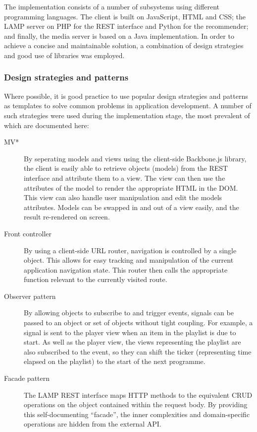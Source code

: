 The implementation consists of a number of subsystems using different programming languages. The client is built on JavaScript, HTML and CSS; the LAMP server on PHP for the REST interface and Python for the recommender; and finally, the media server is based on a Java implementation. In order to achieve a concise and maintainable solution, a combination of design strategies and good use of libraries was employed.

\subsubsection{Design strategies and patterns}

Where possible, it is good practice to use popular design strategies and patterns as templates to solve common problems in application development. A number of such strategies were used during the implementation stage, the most prevalent of which are documented here:

\begin{description}
	\item[MV*] By seperating models and views using the client-side Backbone.js library, the client is easily able to retrieve objects (models) from the REST interface and attribute them to a view. The view can then use the attributes of the model to render the appropriate HTML in the DOM. This view can also handle user manipulation and edit the models attributes. Models can be swapped in and out of a view easily, and the result re-rendered on screen.
	\item[Front controller] By using a client-side URL router, navigation is controlled by a single object. This allows for easy tracking and manipulation of the current application navigation state. This router then calls the appropriate function relevant to the currently visited route.
	\item[Observer pattern] By allowing objects to subscribe to and trigger events, signals can be passed to an object or set of objects without tight coupling. For example, a signal is sent to the player view when an item in the playlist is due to start. As well as the player view, the views representing the playlist are also subscribed to the event, so they can shift the ticker (representing time elapsed on the playlist) to the start of the next programme.
	\item[Facade pattern] The LAMP REST interface maps HTTP methods to the equivalent CRUD operations on the object contained within the request body. By providing this self-documenting ``facade'', the inner complexities and domain-specific operations are hidden from the external API.
\end{description}

